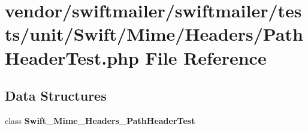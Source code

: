 \section{vendor/swiftmailer/swiftmailer/tests/unit/\+Swift/\+Mime/\+Headers/\+Path\+Header\+Test.php File Reference}
\label{_path_header_test_8php}
\subsection*{Data Structures}
\begin{DoxyCompactItemize}
\item 
class {\bf Swift\+\_\+\+Mime\+\_\+\+Headers\+\_\+\+Path\+Header\+Test}
\end{DoxyCompactItemize}
